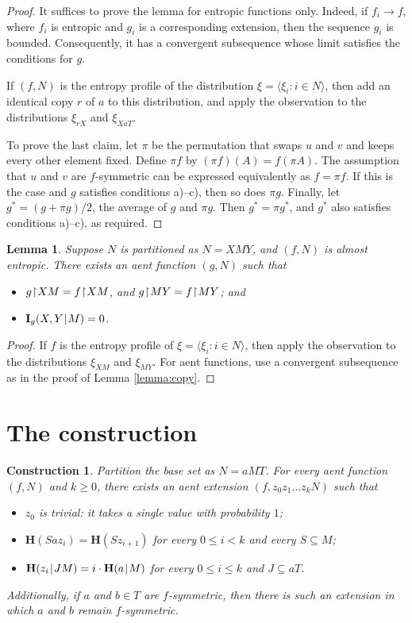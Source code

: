 \documentclass[10pt,a4paper]{amsart}
\def\|{\mskip1.5mu{|}\mskip1.5mu}
\def\H{\mathbf H}
\def\I{\mathbf I}
\newcommand\restr{\mkern1mu{\upharpoonright}\mkern1mu}
\def\<{\langle}\def\>{\rangle}
\newtheorem{lemma}[theorem]{Lemma}
\newtheorem{construction}{Construction}
\begin{document}
\begin{proof}
It suffices to prove the lemma for entropic functions only. Indeed, if $f_i\to
f$, where $f_i$ is entropic and $g_i$ is a corresponding extension, then
the sequence $g_i$ is bounded. Consequently, it has a convergent subsequence
whose limit satisfies the conditions for $g$.

If $(f,N)$ is the entropy profile of the distribution $\xi=\<\xi_i:i\in
N\>$, then add an identical copy $r$ of $a$ to this distribution, and apply
the observation to the distributions $\xi_{rX}$ and $\xi_{XaT}$.

To prove the last claim, let $\pi$ be the permutation that swaps $u$
and $v$ and keeps every other element fixed. Define $\pi f$ by $(\pi
f)(A)=f(\pi A)$. The assumption that $u$ and $v$ are
$f$-symmetric can be expressed equivalently as $f=\pi f$. If this is the
case and $g$ satisfies conditions a)--c), then so does $\pi g$. Finally,
let $g^*=(g+\pi g)/2$, the average of $g$ and $\pi g$. Then $g^*=\pi g^*$,
and $g^*$ also satisfies conditions a)--c), as required.
\end{proof}

\begin{lemma}\label{lemma:maxe}
Suppose $N$ is partitioned as $N=XMY$, and $(f,N)$ is almost entropic.
There exists an aent function $(g,N)$ such that
\begin{itemize}
\item[a)] $g\restr XM = f\restr XM$, and $g\restr MY=f\restr MY$; and
\item[b)] $\I_g(X,Y\|M)=0$.
\end{itemize}
\end{lemma}
\begin{proof}
If $f$ is the entropy profile of $\xi=\<\xi_i:i\in N\>$, then apply the
observation to the distributions $\xi_{XM}$ and $\xi_{MY}$. For aent functions,
use a convergent subsequence as in the proof of Lemma \ref{lemma:copy}.
\end{proof}


\section{The construction}\label{sec:construction}

\begin{construction}\label{defz}
Partition the base set as $N=aMT$. For every aent function $(f,N)$ and $k\ge 0$,
there exists an aent extension $(f,z_0z_1\dots z_kN)$ such that
\begin{itemize}
\item[a)] $z_0$ is trivial: it takes a single value with probability $1$;
\item[b)] $\H(Saz_i) = \H(Sz_{i+1})$ for every $0\le i<k$ and every $S\subseteq M$;
\item[c)] $\H(z_i\|JM)=i\cdot\H(a\|M)$ for every $0\le i\le k$ and $J\subseteq aT$.
\end{itemize}
Additionally, if $a$ and $b\in T$ are $f$-symmetric, then there
is such an extension in which $a$ and $b$ remain $f$-symmetric.
\end{construction}
\end{document}
